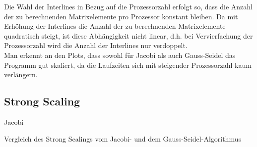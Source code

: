 \documentclass[a4paper,12pt]{scrartcl}
\begin{document}
Die Wahl der Interlines in Bezug auf die Prozessorzahl erfolgt so, dass die Anzahl der zu berechnenden Matrixelemente pro Prozessor konstant bleiben. Da mit Erhöhung der Interlines die Anzahl der zu berechnenden Matrixelemente quadratisch steigt, ist diese Abhängigkeit nicht linear, d.h. bei Vervierfachung der Prozessorzahl wird die Anzahl der Interlines nur verdoppelt.\\
Man erkennt an den Plots, dass sowohl für Jacobi als auch Gauss-Seidel das Programm gut skaliert,
da die Laufzeiten sich mit steigender Prozessorzahl kaum verlängern.
\pagebreak
\subsection{Strong Scaling}
\begin{table}[htb]
  \centering
  \begin{subtable}[b]{.49\linewidth}
    \centering
    \caption{Jacobi}
    \label{strongTabJa}
   \end{subtable}%
   \begin{subtable}[b]{.49\linewidth}
     \centering
     \label{strongTabGS}
  \end{subtable}
  \caption{Vergleich des Strong Scalings vom Jacobi- und dem Gauss-Seidel-Algorithmus}
  \label{strongTab}
\end{table}
\end{document}

